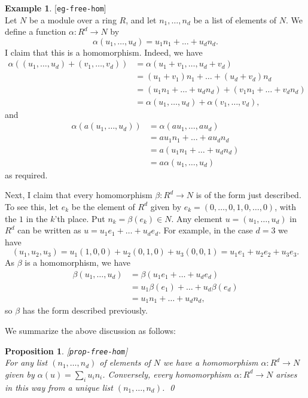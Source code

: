 \documentclass{amsart}
\newcommand{\lbl}[1]{\label{#1}\textup{[\texttt{#1}]}\ \\}
\newcommand{\lbl}{\label}
\newcommand{\al}        {\alpha}
\newcommand{\bt}        {\beta}
\newcommand{\xra}       {\xrightarrow}
\renewcommand{\:}{\colon}
\newtheorem{proposition}[theorem]{Proposition}
\theoremstyle{definition}
\newtheorem{example}[theorem]{Example}
\begin{document}
\begin{example}\lbl{eg-free-hom}
 Let $N$ be a module over a ring $R$, and let $n_1,\ldots,n_d$ be a
 list of elements of $N$.  We define a function $\al\:R^d\xra{}N$ by 
 \[ \al(u_1,\ldots,u_d) = u_1n_1 + \ldots+u_d n_d. \]
 I claim that this is a homomorphism.  Indeed, we have
 \begin{align*}
  \al((u_1,\ldots,u_d)+(v_1,\ldots,v_d)) &= 
   \al(u_1+v_1,\ldots,u_d+v_d) \\
   &= (u_1+v_1)n_1 + \ldots + (u_d+v_d)n_d \\
   &= (u_1n_1+\ldots+u_dn_d) + (v_1n_1+\ldots+v_dn_d) \\
   &= \al(u_1,\ldots,u_d) + \al(v_1,\ldots,v_d), 
 \end{align*}
 and
 \begin{align*}
  \al(a(u_1,\ldots,u_d)) &= \al(au_1,\ldots,au_d) \\
   &= au_1n_1 + \ldots + au_dn_d \\
   &= a(u_1n_1+\ldots+u_dn_d) \\
   &= a\al(u_1,\ldots,u_d)
 \end{align*}
 as required.

 Next, I claim that every homomorphism $\bt\:R^d\xra{}N$ is of the
 form just described.  To see this, let $e_k$ be the element of $R^d$
 given by $e_k=(0,\ldots,0,1,0,\ldots,0)$, with the $1$ in the $k$'th
 place.  Put $n_k=\bt(e_k)\in N$.  Any element $u=(u_1,\ldots,u_d)$ in
 $R^d$ can be written as $u=u_1e_1+\ldots+u_de_d$.  For example, in
 the case $d=3$ we have 
 \[ (u_1,u_2,u_3) = u_1(1,0,0) + u_2(0,1,0) + u_3(0,0,1) = 
      u_1e_1 + u_2e_2 + u_3e_3.
 \]
 As $\bt$ is a homomorphism, we have
 \begin{align*}
  \bt(u_1,\ldots,u_d) &= \bt(u_1e_1+\ldots+u_de_d) \\
                      &= u_1\bt(e_1) + \ldots + u_d\bt(e_d) \\
                      &= u_1 n_1 + \ldots + u_d n_d,
 \end{align*}
 so $\bt$ has the form described previously.
\end{example}
We summarize the above discussion as follows:
\begin{proposition}\lbl{prop-free-hom}
 For any list $(n_1,\ldots,n_d)$ of elements of $N$ we have a
 homomorphism $\al\:R^d\xra{}N$ given by $\al(u)=\sum_iu_in_i$.
 Conversely, every homomorphism $\al\:R^d\xra{}N$ arises in this way
 from a unique list $(n_1,\ldots,n_d)$. \qed
\end{proposition}
\end{document}
